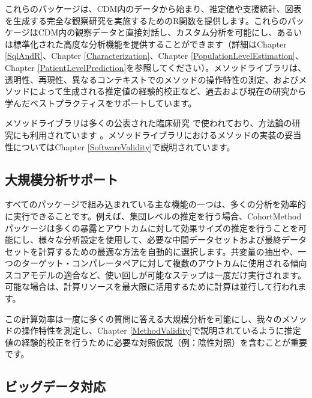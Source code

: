 \documentclass[
  11pt]{book}
\theoremstyle{definition}
\theoremstyle{definition}
\theoremstyle{definition}
\theoremstyle{definition}
\theoremstyle{remark}
\begin{document}
これらのパッケージは、CDM内のデータから始まり、推定値や支援統計、図表を生成する完全な観察研究を実施するためのR関数を提供します。これらのパッケージはCDM内の観察データと直接対話し、カスタム分析を可能にし、あるいは標準化された高度な分析機能を提供することができます（詳細はChapter \ref{SqlAndR}、Chapter \ref{Characterization}、Chapter \ref{PopulationLevelEstimation}、Chapter \ref{PatientLevelPrediction}を参照してください）。メソッドライブラリは、透明性、再現性、異なるコンテキストでのメソッドの操作特性の測定、およびメソッドによって生成される推定値の経験的校正など、過去および現在の研究から学んだベストプラクティスをサポートしています。

メソッドライブラリは多くの公表された臨床研究 \citetext{\citealp[ ]{boland_2017}; \citealp[ ]{duke_2017}; \citealp[ ]{ramcharran_2017}; \citealp[ ]{weinstein_2017}; \citealp[ ]{wang_2017}; \citealp[ ]{ryan_2017}; \citealp[ ]{ryan_2018}; \citealp[ ]{vashisht_2018}; \citealp[ ]{yuan_2018}; \citealp[ ]{johnston_2019}} で使われており、方法論の研究にも利用されています \citetext{\citealp[ ]{schuemie_2014}; \citealp[ ]{schuemie_2016}; \citealp[ ]{reps2018}; \citealp[ ]{tian_2018}; \citealp[ ]{schuemie_2018}; \citealp[ ]{schuemie_2018b}; \citealp[ ]{reps_2019}}。メソッドライブラリにおけるメソッドの実装の妥当性についてはChapter \ref{SoftwareValidity}で説明されています。

\subsection{大規模分析サポート}\label{ux5927ux898fux6a21ux5206ux6790ux30b5ux30ddux30fcux30c8}

すべてのパッケージで組み込まれている主な機能の一つは、多くの分析を効率的に実行できることです。例えば、集団レベルの推定を行う場合、CohortMethodパッケージは多くの暴露とアウトカムに対して効果サイズの推定を行うことを可能にし、様々な分析設定を使用して、必要な中間データセットおよび最終データセットを計算するための最適な方法を自動的に選択します。共変量の抽出や、一つのターゲット・コンパレータペアに対して複数のアウトカムに使用される傾向スコアモデルの適合など、使い回しが可能なステップは一度だけ実行されます。可能な場合は、計算リソースを最大限に活用するために計算は並行して行われます。

この計算効率は一度に多くの質問に答える大規模分析を可能にし、我々のメソッドの操作特性を測定し、Chapter \ref{MethodValidity}で説明されているように推定値の経験的校正を行うために必要な対照仮説（例：陰性対照）を含むことが重要です。 

\subsection{ビッグデータ対応}\label{BigDataSupport}
\end{document}
